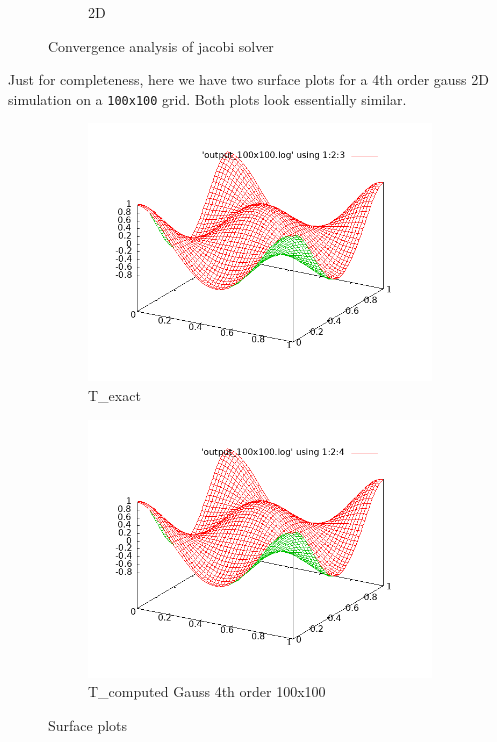 \documentclass[12 pt, final]{article}
\begin{document}
\begin{itemize}
\begin{itemize}
\begin{figure}[H]
\begin{subfigure}{.5\textwidth}
          \caption{2D}
          \label{fig:sub2}
        \end{subfigure}
        \caption{Convergence analysis of jacobi solver}
        \label{fig:test}
        \end{figure}
    \end{itemize}
    Just for completeness, here we have two surface plots for a 4th order gauss 2D simulation on a \texttt{100x100} grid. Both plots look essentially similar.
  
          \begin{figure}[H]
        \centering
        \begin{subfigure}{.5\textwidth}
          \centering
          \includegraphics[width=.99\linewidth]{figures/surface_T_exact.png}
          \caption{T\_exact}
          \label{fig:sub1}
        \end{subfigure}%
        \begin{subfigure}{.5\textwidth}
          \centering
          \includegraphics[width=.99\linewidth]{figures/surface_T_computed.png}
          \caption{T\_computed Gauss 4th order 100x100}
          \label{fig:sub2}
        \end{subfigure}
        \caption{Surface plots}
        \label{fig:test}
        \end{figure}


\end{itemize}
\end{document}
